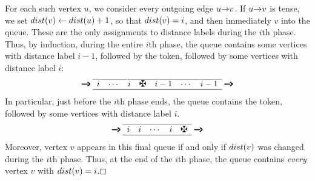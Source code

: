 For each such vertex $u$, we consider every outgoing edge $u\mathord{\rightarrow}v$.
If $u\mathord{\rightarrow}v$ is tense, we set $dist(v) \gets dist(u) + 1$, so that $dist(v) = i$, and then immediately  $v$ into the queue.
These are the only assignments to distance labels during the $i$th phase.
Thus, by induction, during the entire $i$th phase, the queue contains some vertices with distance label $i - 1$, followed by the token, followed by some vertices with distance label $i$:
\[
\mbox{\rule[.5ex]{.7em}{1.2pt}\kern-.5pt\raisebox{.5ex}{\rotatebox[origin=r]{-40}{\rule{.38em}{1.2pt}}}\kern-.38em\raisebox{.5ex}{\rotatebox[origin=r]{40}{\rule{.38em}{1.2pt}}}}
\;\begin{array}{ccccccc}\hline i & \cdots & i & \maltese & i-1 & \cdots & i-1\\\hline\end{array}\;
\mbox{\rule[.5ex]{.7em}{1.2pt}\kern-.5pt\raisebox{.5ex}{\rotatebox[origin=r]{-40}{\rule{.38em}{1.2pt}}}\kern-.38em\raisebox{.5ex}{\rotatebox[origin=r]{40}{\rule{.38em}{1.2pt}}}}
\]
In particular, just before the $i$th phase ends, the queue contains the token, followed by some vertices with distance label $i$.
\[
\mbox{\rule[.5ex]{.7em}{1.2pt}\kern-.5pt\raisebox{.5ex}{\rotatebox[origin=r]{-40}{\rule{.38em}{1.2pt}}}\kern-.38em\raisebox{.5ex}{\rotatebox[origin=r]{40}{\rule{.38em}{1.2pt}}}}
\;\begin{array}{ccccc}\hline i & i & \cdots & i & \maltese\\\hline\end{array}\;
\mbox{\rule[.5ex]{.7em}{1.2pt}\kern-.5pt\raisebox{.5ex}{\rotatebox[origin=r]{-40}{\rule{.38em}{1.2pt}}}\kern-.38em\raisebox{.5ex}{\rotatebox[origin=r]{40}{\rule{.38em}{1.2pt}}}}
\]
Moreover, vertex $v$ appears in this final queue if and only if $dist(v)$ was changed during the $i$th phase.
Thus, at the end of the $i$th phase, the queue contains \textit{every} vertex $v$ with $dist(v) = i$.\hfill$\mdlgwhtsquare$


